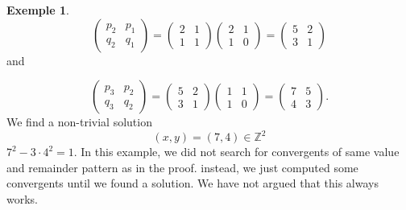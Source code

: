\documentclass[a4paper,11pt,american]{article}
\theoremstyle{plain}
\theoremstyle{definition}
\newtheorem{example}{Exemple}
\begin{document}
\begin{example}
    \begin{displaymath}
      \begin{pmatrix}
        p_{2} & p_{1}  \\
        q_{2} & q_{1}  
      \end{pmatrix} =
      \begin{pmatrix}
        2 & 1  \\
        1 & 1  
      \end{pmatrix}
       \begin{pmatrix}
        2 & 1  \\
        1 & 0  
      \end{pmatrix}  =
      \begin{pmatrix}
        5 & 2  \\
        3 & 1  
      \end{pmatrix} 
    \end{displaymath}
    and
    
    \begin{displaymath}
      \begin{pmatrix}
        p_{3} & p_{2}  \\
        q_{3} & q_{2}  
      \end{pmatrix} =
      \begin{pmatrix}
        5 & 2  \\
        3 & 1  
      \end{pmatrix}
       \begin{pmatrix}
        1 & 1  \\
        1 & 0  
      \end{pmatrix}  =
      \begin{pmatrix}
        7 & 5  \\
        4 & 3  
      \end{pmatrix}. 
    \end{displaymath}
    We find a non-trivial solution
    \begin{displaymath}
      (x,y) = (7,4)  ∈ℤ^2
    \end{displaymath}
    $7^2 - 3⋅ 4^2 = 1$. In this example, we did not search for convergents of same value and remainder pattern as in the proof. instead, we just computed some convergents until we found a solution. We have not argued that  this always works. 
  \end{example}




\end{document}
